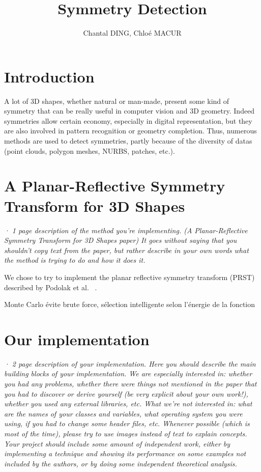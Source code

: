 \documentclass[10pt,a4paper]{article}			%
\title{Symmetry Detection}
\author{Chantal DING, Chloé MACUR}
\begin{document}


\newpage
\tableofcontents

\newpage
	
	\section*{Introduction}
  
	A lot of 3D shapes, whether natural or man-made, present some kind of symmetry that can be really useful in computer vision and 3D geometry.  Indeed symmetries allow certain economy, especially in digital representation, but they are also involved in pattern recognition or geometry completion. Thus, numerous methods are used to detect symmetries, partly because of the diversity of datas (point clouds, polygon meshes, NURBS, patches, etc.).  
 
	\section{A Planar-Reflective Symmetry Transform for 3D Shapes}
	
	\textit{· 1 page description of the method you're implementing. (A Planar-Reflective Symmetry Transform for 3D Shapes paper) It goes without saying that you shouldn't copy text from the paper, but rather describe in your own words what the method is trying to do and how it does it. \\}
	
	We chose to try to implement the planar reflective symmetry transform (PRST) described by Podolak et al. ~\cite{Podolak:2006:APS}.
	
	Monte Carlo évite brute force, sélection intelligente selon l'énergie de la fonction
	
	\section{Our implementation}
	
	\textit{· 2 page description of your implementation. Here you should describe the main building blocks of your implementation. We are especially interested in: whether you had any problems, whether there were things not mentioned in the paper that you had to discover or derive yourself (be very explicit about your own work!), whether you used any external libraries, etc. What we're not interested in: what are the names of your classes and variables, what operating system you were using, if you had to change some header files, etc. Whenever possible (which is most of the time), please try to use images instead of text to explain concepts.\\
	Your project should include some amount of independent work, either by implementing a technique and showing its performance on some examples not included by the authors, or by doing some independent theoretical analysis.\\}
\end{document}

